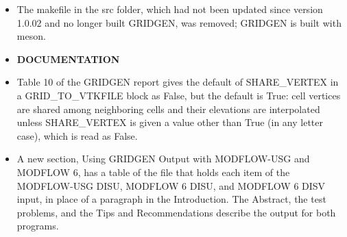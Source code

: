 \begin{itemize}[label=--]
  \item The makefile in the src folder, which had not been updated since version 1.0.02 and no longer built GRIDGEN, was removed; GRIDGEN is built with meson.
  \item[] \textbf{DOCUMENTATION}
  \item Table 10 of the GRIDGEN report gives the default of SHARE\_VERTEX in a GRID\_TO\_VTKFILE block as False, but the default is True: cell vertices are shared among neighboring cells and their elevations are interpolated unless SHARE\_VERTEX is given a value other than True (in any letter case), which is read as False.
  \item A new section, Using GRIDGEN Output with MODFLOW-USG and MODFLOW 6, has a table of the file that holds each item of the MODFLOW-USG DISU, MODFLOW 6 DISU, and MODFLOW 6 DISV input, in place of a paragraph in the Introduction. The Abstract, the test problems, and the Tips and Recommendations describe the output for both programs.
\end{itemize}
